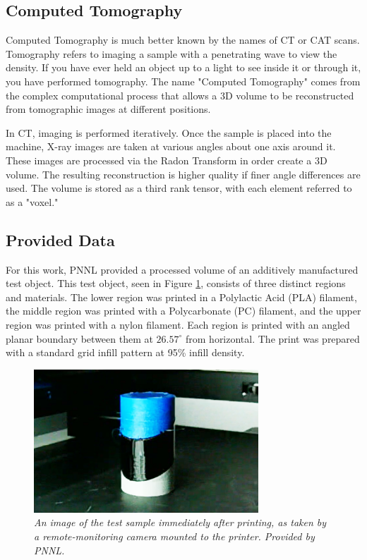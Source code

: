 \documentclass[11pt, letterpaper]{article}
\begin{document}
\subsection{Computed Tomography}
    Computed Tomography is much better known by the names of CT or CAT scans. Tomography refers to imaging a sample with a penetrating wave to view the density. If you have ever held an object up to a light to see inside it or through it, you have performed tomography. The name "Computed Tomography" comes from the complex computational process that allows a 3D volume to be reconstructed from tomographic images at different positions.

    In CT, imaging is performed iteratively. Once the sample is placed into the machine, X-ray images are taken at various angles about one axis around it. These images are processed via the Radon Transform in order create a 3D volume. The resulting reconstruction is higher quality if finer angle differences are used. The volume is stored as a third rank tensor, with each element referred to as a "voxel."

\subsection{Provided Data}
    For this work, PNNL provided a processed volume of an additively manufactured test object. This test object, seen in Figure \ref{fig:test-object}, consists of three distinct regions and materials. The lower region was printed in a Polylactic Acid (PLA) filament, the middle region was printed with a Polycarbonate (PC) filament, and the upper region was printed with a nylon filament. Each region is printed with an angled planar boundary between them at $26.57^\circ$ from horizontal. The print was prepared with a standard grid infill pattern at 95\% infill density.

    \begin{figure}[H]
        \centering
        \label{fig:test-object}
        \includegraphics[width=0.75\textwidth]{test_sample.png}
        \caption{\emph{An image of the test sample immediately after printing, as taken by a remote-monitoring camera mounted to the printer. Provided by PNNL.}}
    \end{figure}
\end{document}
